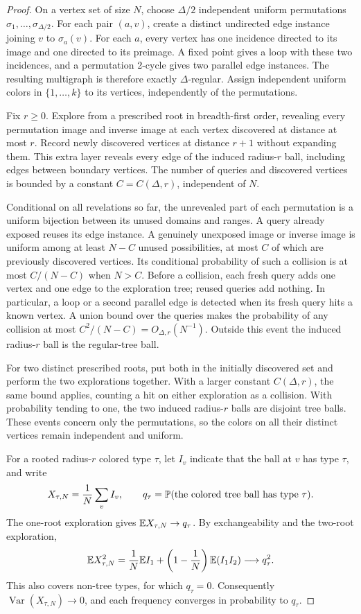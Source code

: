 \begin{proof}
On a vertex set of size $N$, choose $\Delta/2$ independent uniform
permutations $\sigma_1,\ldots,\sigma_{\Delta/2}$. For each pair $(a,v)$,
create a distinct undirected edge instance joining $v$ to $\sigma_a(v)$.
For each $a$, every vertex has one incidence directed to its image and
one directed to its preimage. A fixed point gives a loop with these two
incidences, and a permutation 2-cycle gives two parallel edge instances.
The resulting multigraph is therefore exactly $\Delta$-regular. Assign
independent uniform colors in $\{1,\ldots,k\}$ to its vertices, independently
of the permutations.

Fix $r\ge0$. Explore from a prescribed root in breadth-first order, revealing
every permutation image and inverse image at each vertex discovered at
distance at most $r$. Record newly discovered vertices at distance $r+1$
without expanding them. This extra layer reveals every edge of the induced
radius-$r$ ball, including edges between boundary vertices. The number of
queries and discovered vertices is bounded by a constant $C=C(\Delta,r)$,
independent of $N$.

Conditional on all revelations so far, the unrevealed part of each
permutation is a uniform bijection between its unused domains and ranges.
A query already exposed reuses its edge instance. A genuinely unexposed
image or inverse image is uniform among at least $N-C$ unused possibilities,
at most $C$ of which are previously discovered vertices. Its conditional
probability of such a collision is at most $C/(N-C)$ when $N>C$.
Before a collision, each fresh query adds one vertex and one edge to the
exploration tree; reused queries add nothing. In particular, a loop or a
second parallel edge is detected when its fresh query hits a known vertex.
A union bound over the queries makes the probability of any collision at
most $C^2/(N-C)=O_{\Delta,r}(N^{-1})$. Outside this event the induced
radius-$r$ ball is the regular-tree ball.

For two distinct prescribed roots, put both in the initially discovered
set and perform the two explorations together. With a larger constant
$C(\Delta,r)$, the same bound applies, counting a hit on either exploration
as a collision. With probability tending to one, the two induced
radius-$r$ balls are disjoint tree balls. These events concern only the
permutations, so the colors on all their distinct vertices remain
independent and uniform.

For a rooted radius-$r$ colored type $\tau$, let $I_v$ indicate that the
ball at $v$ has type $\tau$, and write
\[
 X_{\tau,N}=\frac1N\sum_v I_v,
 \qquad q_\tau=\mathbb P(\text{the colored tree ball has type }\tau).
\]
The one-root exploration gives $\mathbb E X_{\tau,N}\to q_\tau$. By exchangeability
and the two-root exploration,
\[
 \mathbb E X_{\tau,N}^2
 =\frac1N\mathbb E I_1+\left(1-\frac1N\right)\mathbb E(I_1I_2)
 \longrightarrow q_\tau^2.
\]
This also covers non-tree types, for which $q_\tau=0$. Consequently
$\operatorname{Var}(X_{\tau,N})\to0$, and each frequency converges in
probability to $q_\tau$.


\end{proof}
